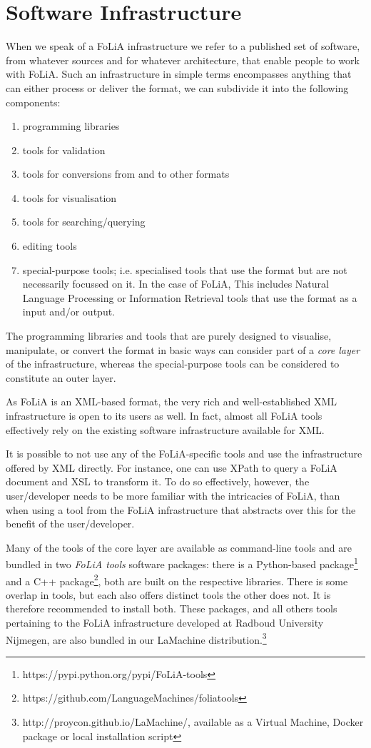 \documentclass[a4paper,10pt,twoside]{article}
\begin{document}
\section{Software Infrastructure}

When we speak of a FoLiA infrastructure we refer to a published set of
software, from whatever sources and for whatever architecture, that enable
people to work with FoLiA.  Such an infrastructure in simple
terms encompasses anything that can either process or deliver the format, we
can subdivide it into the following components:

\begin{enumerate}
\item programming libraries
\item tools for validation
\item tools for conversions from and to other formats
\item tools for visualisation
\item tools for searching/querying
\item editing tools
\item special-purpose tools; i.e. specialised tools that use the format but are
    not necessarily focussed on it. In the case of FoLiA, This includes Natural
    Language Processing or Information Retrieval tools that use the format as a
    input and/or output.
\end{enumerate}

The programming libraries and tools that are purely designed to visualise,
manipulate, or convert the format in basic ways can consider part of a
\emph{core layer} of the infrastructure, whereas the special-purpose tools can
be considered to constitute an outer layer.

As FoLiA is an XML-based format, the very rich and well-established XML
infrastructure is open to its users as well. In fact, almost all FoLiA tools
effectively rely on the existing software infrastructure available for XML. 

It is possible to not use any of the FoLiA-specific tools and use the
infrastructure offered by XML directly. For instance, one can use XPath to
query a FoLiA document and XSL to transform it. To do so effectively, however,
the user/developer needs to be more familiar with the intricacies of FoLiA,
than when using a tool from the FoLiA infrastructure that abstracts over this
for the benefit of the user/developer.

Many of the tools of the core layer are available as command-line tools and are
bundled in two \emph{FoLiA tools} software packages: there is a Python-based
package\footnote{https://pypi.python.org/pypi/FoLiA-tools} and a C++
package\footnote{https://github.com/LanguageMachines/foliatools}, both are
built on the respective libraries.  There is some overlap in tools, but each
also offers distinct tools the other does not. It is therefore recommended to
install both. These packages, and all others tools pertaining to the FoLiA
infrastructure developed at Radboud University Nijmegen, are also bundled in our
LaMachine distribution.\footnote{http://proycon.github.io/LaMachine/, available
as a Virtual Machine, Docker package or local installation script}
\end{document}
